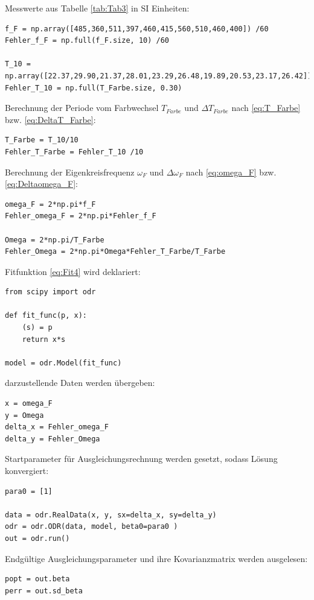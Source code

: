\documentclass[a4paper,10pt]{article}
\begin{document}
Messwerte aus Tabelle \ref{tab:Tab3} in SI Einheiten:
\begin{lstlisting}
f_F = np.array([485,360,511,397,460,415,560,510,460,400]) /60
Fehler_f_F = np.full(f_F.size, 10) /60

T_10 = np.array([22.37,29.90,21.37,28.01,23.29,26.48,19.89,20.53,23.17,26.42]) 
Fehler_T_10 = np.full(T_Farbe.size, 0.30)

\end{lstlisting}

Berechnung der Periode vom Farbwechsel \(T_{Farbe}\) und \(\Delta T_{Farbe}\) nach \eqref{eq:T_Farbe} bzw. \eqref{eq:DeltaT_Farbe}:\begin{lstlisting}
T_Farbe = T_10/10
Fehler_T_Farbe = Fehler_T_10 /10

\end{lstlisting}

Berechnung der Eigenkreisfrequenz  \(\omega_F\) und \(\Delta\omega_F\) nach \eqref{eq:omega_F} bzw. \eqref{eq:Deltaomega_F}:\begin{lstlisting}
omega_F = 2*np.pi*f_F 
Fehler_omega_F = 2*np.pi*Fehler_f_F

Omega = 2*np.pi/T_Farbe 
Fehler_Omega = 2*np.pi*Omega*Fehler_T_Farbe/T_Farbe

\end{lstlisting}

Fitfunktion \eqref{eq:Fit4} wird deklariert:\begin{lstlisting}
from scipy import odr

def fit_func(p, x):
    (s) = p
    return x*s

model = odr.Model(fit_func)

\end{lstlisting}

darzustellende Daten werden übergeben:\begin{lstlisting}
x = omega_F
y = Omega
delta_x = Fehler_omega_F
delta_y = Fehler_Omega

\end{lstlisting}

Startparameter für Ausgleichungsrechnung werden gesetzt, sodass Lösung konvergiert:\begin{lstlisting}
para0 = [1]

data = odr.RealData(x, y, sx=delta_x, sy=delta_y)
odr = odr.ODR(data, model, beta0=para0 )
out = odr.run()

\end{lstlisting}

Endgültige Ausgleichungsparameter und ihre Kovarianzmatrix werden ausgelesen:\begin{lstlisting}
popt = out.beta
perr = out.sd_beta

\end{lstlisting}
\end{document}
